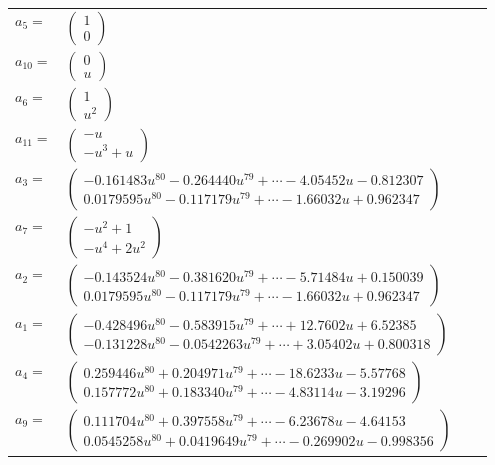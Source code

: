 \documentclass[1p]{elsarticle_modified}
\theoremstyle{definition}
\begin{document}
\begin{tabular}{m{7pt} m{180pt} m{7pt} m{180pt} }
\flushright $a_{5}=$&$\begin{pmatrix}1\\0\end{pmatrix}$ \\
\flushright $a_{10}=$&$\begin{pmatrix}0\\u\end{pmatrix}$ \\
\flushright $a_{6}=$&$\begin{pmatrix}1\\u^2\end{pmatrix}$ \\
\flushright $a_{11}=$&$\begin{pmatrix}- u\\- u^3+u\end{pmatrix}$ \\
\flushright $a_{3}=$&$\begin{pmatrix}-0.161483 u^{80}-0.264440 u^{79}+\cdots-4.05452 u-0.812307\\0.0179595 u^{80}-0.117179 u^{79}+\cdots-1.66032 u+0.962347\end{pmatrix}$ \\
\flushright $a_{7}=$&$\begin{pmatrix}- u^2+1\\- u^4+2 u^2\end{pmatrix}$ \\
\flushright $a_{2}=$&$\begin{pmatrix}-0.143524 u^{80}-0.381620 u^{79}+\cdots-5.71484 u+0.150039\\0.0179595 u^{80}-0.117179 u^{79}+\cdots-1.66032 u+0.962347\end{pmatrix}$ \\
\flushright $a_{1}=$&$\begin{pmatrix}-0.428496 u^{80}-0.583915 u^{79}+\cdots+12.7602 u+6.52385\\-0.131228 u^{80}-0.0542263 u^{79}+\cdots+3.05402 u+0.800318\end{pmatrix}$ \\
\flushright $a_{4}=$&$\begin{pmatrix}0.259446 u^{80}+0.204971 u^{79}+\cdots-18.6233 u-5.57768\\0.157772 u^{80}+0.183340 u^{79}+\cdots-4.83114 u-3.19296\end{pmatrix}$ \\
\flushright $a_{9}=$&$\begin{pmatrix}0.111704 u^{80}+0.397558 u^{79}+\cdots-6.23678 u-4.64153\\0.0545258 u^{80}+0.0419649 u^{79}+\cdots-0.269902 u-0.998356\end{pmatrix}$ \\

\end{tabular}
\end{document}
